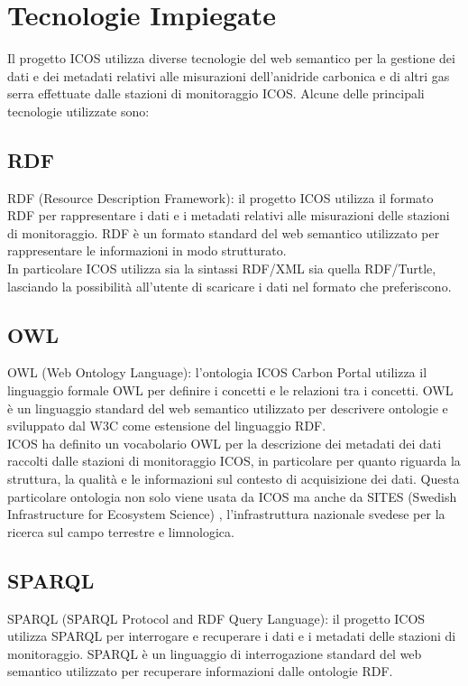 \chapter{Tecnologie Impiegate}
\label{chap:tecnologie}

Il progetto ICOS utilizza diverse tecnologie del web semantico per la gestione dei dati e dei metadati relativi alle misurazioni dell'anidride carbonica e di altri gas serra effettuate dalle stazioni di monitoraggio ICOS. Alcune delle principali tecnologie utilizzate sono:

\section{RDF}
\label{section:rdf}
RDF (Resource Description Framework): il progetto ICOS utilizza il
formato RDF per rappresentare i dati e i metadati relativi
alle misurazioni delle stazioni di monitoraggio.
RDF è un formato standard del web semantico utilizzato
per rappresentare le informazioni in modo strutturato.\\

In particolare ICOS utilizza sia la sintassi RDF/XML sia quella
RDF/Turtle, lasciando la possibilità all'utente di scaricare i dati
nel formato che preferiscono.

\section{OWL}
\label{section:owl}
OWL (Web Ontology Language): l'ontologia ICOS
Carbon Portal utilizza il linguaggio formale OWL
per definire i concetti e le relazioni tra i concetti.
OWL è un linguaggio standard del web semantico utilizzato
per descrivere ontologie e sviluppato dal W3C come estensione
del linguaggio RDF.\\

ICOS ha definito un vocabolario OWL per la
descrizione dei metadati dei dati raccolti
dalle stazioni di monitoraggio ICOS,
in particolare per quanto riguarda la struttura,
la qualità e le informazioni sul contesto di
acquisizione dei dati. Questa particolare ontologia non solo
viene usata da ICOS ma anche da SITES (Swedish
Infrastructure for Ecosystem Science) \cite{SITESHomepage},
l'infrastruttura nazionale svedese per la ricerca sul campo
terrestre e limnologica.

\section{SPARQL}
\label{section:sparql}
SPARQL (SPARQL Protocol and RDF Query Language): il progetto
ICOS utilizza SPARQL per interrogare e recuperare i dati e
i metadati delle stazioni di monitoraggio.
SPARQL è un linguaggio di interrogazione standard
del web semantico utilizzato per recuperare informazioni
dalle ontologie RDF.\\

